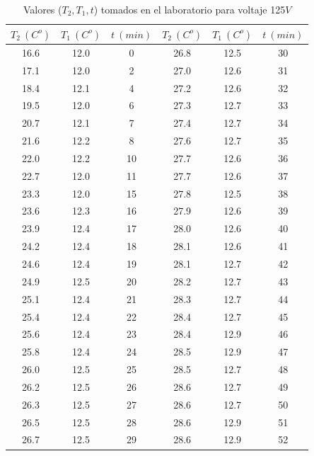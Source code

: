 \documentclass[12pt,a4paper]{article}
\begin{document}
\begin{table}[h!] 	 \centering 
\begin{tabular}{|c|c|c||c|c|c|} 
\hline 
$T_2 \ (C^o)$ & $T_1 \ (C^o) $ & $t \ (min)$ & $T_2 \ (C^o)$ & $T_1 \ (C^o) $ & $t \ (min)$ \\ \hline 
16.6 &  12.0 & 0 & 26.8 & 12.5 & 30 \\ 
17.1 &  12.0 & 2 & 27.0 & 12.6 & 31 \\ 
18.4 &  12.1 & 4 & 27.2 & 12.6 & 32 \\ 
19.5 &  12.0 & 6 & 27.3 & 12.7 & 33 \\ 
20.7 &  12.1 & 7 & 27.4 & 12.7 & 34 \\ 
21.6 &  12.2 & 8 & 27.6 & 12.7 & 35 \\ 
22.0 &  12.2 & 10 & 27.7 & 12.6 & 36 \\ 
22.7 &  12.0 & 11 & 27.7 & 12.6 & 37 \\ 
23.3 &  12.0 & 15 & 27.8 & 12.5 & 38 \\ 
23.6 &  12.3 & 16 & 27.9 & 12.6 & 39 \\ 
23.9 &  12.4 & 17 & 28.0 & 12.6 & 40 \\ 
24.2 &  12.4 & 18 & 28.1 & 12.6 & 41 \\ 
24.6 &  12.4 & 19 & 28.1 & 12.7 & 42 \\ 
24.9 &  12.5 & 20 & 28.2 & 12.7 & 43 \\ 
25.1 &  12.4 & 21 & 28.3 & 12.7 & 44 \\ 
25.4 &  12.4 & 22 & 28.4 & 12.7 & 45 \\ 
25.6 &  12.4 & 23 & 28.4 & 12.9 & 46 \\ 
25.8 &  12.4 & 24 & 28.5 & 12.9 & 47 \\ 
26.0 &  12.5 & 25 & 28.5 & 12.7 & 48 \\ 
26.2 &  12.5 & 26 & 28.6 & 12.7 & 49 \\ 
26.3 &  12.5 & 27 & 28.6 & 12.7 & 50 \\ 
26.5 &  12.5 & 28 & 28.6 & 12.9 & 51 \\ 
26.7 &  12.5 & 29 & 28.6 & 12.9 & 52 \\ 
\hline 
\end{tabular} 
\caption{Valores ($T_2,T_1,t$) tomados en el laboratorio para voltaje 125$V$} 
\label{tab:} 
\end{table} 



\newpage
\end{document}
